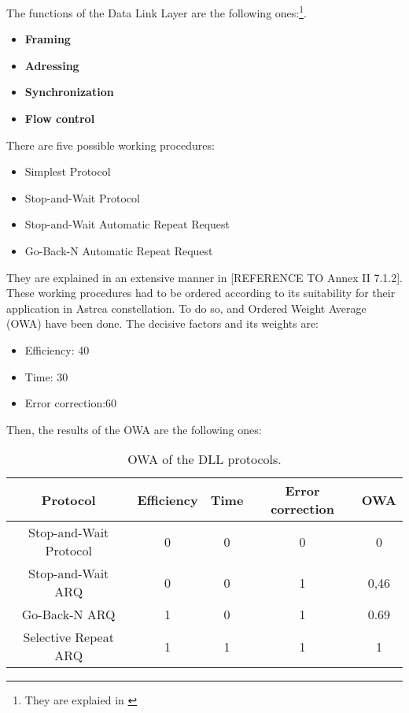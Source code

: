 The functions of the Data Link Layer are the following ones:\footnote{They are explaied in \cite[Chapter 1]{annex3}}.

\begin{itemize}
\item \textbf{Framing}
\item \textbf{Adressing}
\item \textbf{Synchronization}
\item \textbf{Flow control}
\end{itemize}

There are five possible working procedures:

\begin{itemize}
\item Simplest Protocol
\item Stop-and-Wait Protocol
\item Stop-and-Wait Automatic Repeat Request
\item Go-Back-N Automatic Repeat Request
\end{itemize}

They are explained in an extensive manner in [REFERENCE TO Annex II 7.1.2]. These working procedures had to be ordered according to its suitability for their application in Astrea constellation. To do so, and Ordered Weight Average (OWA) have been done. The decisive factors and its weights are: 

\begin{itemize}
\item Efficiency: 40
\item Time: 30
\item Error correction:60
\end{itemize}

Then, the results of the OWA are the following ones:

\begin{table}[H]
\begin{center}
\begin{tabular}{ | c | c | c | c | c |}
\hline
Protocol&Efficiency&Time&Error correction&OWA\\
\hline
Stop-and-Wait Protocol&0&0&0&0\\
\hline
Stop-and-Wait ARQ&0&0&1&0,46\\
\hline
Go-Back-N ARQ&1&0&1&0.69\\
\hline
Selective Repeat ARQ&1&1&1&1\\
\hline
\end{tabular}
\caption{OWA of the DLL protocols.}
\end{center}
\end{table} 

